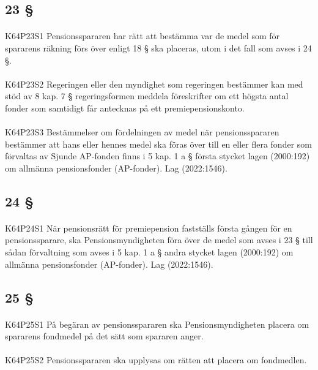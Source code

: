 \documentclass[a4paper,notitlepage,openany,10pt]{book}
\begin{document}
\subsection*{23 §}
\paragraph*{}
{\tiny K64P23S1}
Pensionsspararen har rätt att bestämma var de medel som för spararens räkning förs över enligt 18 § ska placeras, utom i det fall som avses i 24 §.
\paragraph*{}
{\tiny K64P23S2}
Regeringen eller den myndighet som regeringen bestämmer kan med stöd av 8 kap. 7 § regeringsformen meddela föreskrifter om ett högsta antal fonder som samtidigt får antecknas på ett premiepensionskonto.
\paragraph*{}
{\tiny K64P23S3}
Bestämmelser om fördelningen av medel när pensionsspararen bestämmer att hans eller hennes medel ska föras över till en eller flera fonder som förvaltas av Sjunde AP-fonden finns i 5 kap. 1 a § första stycket lagen (2000:192) om allmänna pensionsfonder (AP-fonder).
Lag (2022:1546).
\subsection*{24 §}
\paragraph*{}
{\tiny K64P24S1}
När pensionsrätt för premiepension fastställs första gången för en pensionssparare, ska Pensionsmyndigheten föra över de medel som avses i 23 § till sådan förvaltning som avses i 5 kap. 1 a § andra stycket lagen (2000:192) om allmänna pensionsfonder (AP-fonder).
Lag (2022:1546).
\subsection*{25 §}
\paragraph*{}
{\tiny K64P25S1}
På begäran av pensionsspararen ska Pensionsmyndigheten placera om spararens fondmedel på det sätt som spararen anger.
\paragraph*{}
{\tiny K64P25S2}
Pensionsspararen ska upplysas om rätten att placera om fondmedlen.
\end{document}
